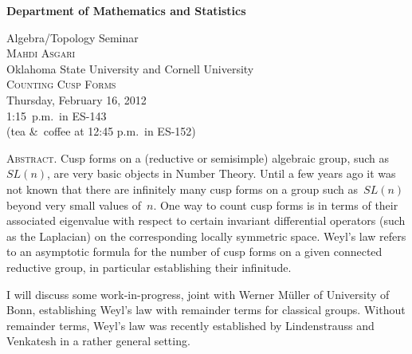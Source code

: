 \documentclass[12pt]{article}
\begin{document}
\noindent\hspace{-28px}%
\hfill\textsf{\textbf{\footnotesize%
Department of Mathematics and Statistics}}\bigskip\bigskip

\begin{center}\Large
  \textsf{{\huge Algebra/Topology Seminar}}\\[2.5\bigskipamount]
  \textsc{Mahdi Asgari}\\
  {\large Oklahoma State University and Cornell University}\\[\bigskipamount]
  \textsc{Counting Cusp Forms}\\[2\bigskipamount]
  Thursday, February 16, 2012\\ 1:15~p.m.\ in ES-143\\
  (tea \&\ coffee at 12:45 p.m.\ in ES-152)
\end{center}\bigskip\bigskip

\large\noindent\textsc{Abstract.}
Cusp forms on a (reductive or semisimple) algebraic group, such
as~$SL(n)$, are very basic objects in Number Theory. Until a few years ago
it was not known that there are infinitely many cusp forms on a group such
as~$SL(n)$ beyond very small values of~$n$. One way to count cusp forms is in
terms of their associated eigenvalue with respect to certain invariant
differential operators (such as the Laplacian) on the corresponding
locally symmetric space. Weyl's law refers to an asymptotic formula for
the number of cusp forms on a given connected reductive group, in
particular establishing their infinitude.

I will discuss some work-in-progress, joint with Werner M\"uller of
University of Bonn, establishing Weyl's law with remainder terms for
classical groups. Without remainder terms, Weyl's law was recently
established by Lindenstrauss and Venkatesh in a rather general setting.
\end{document}

